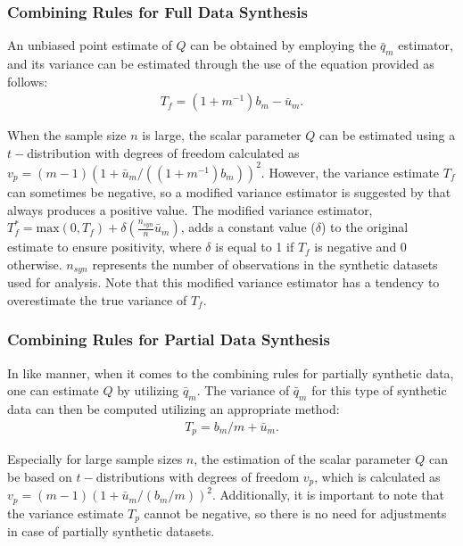 \subsubsection{Combining Rules for Full Data Synthesis}
\label{subsubsec:fullSyn}
An unbiased point estimate of $Q$ can be obtained by employing the $\bar{q}_m$ estimator, and its variance can be estimated through the use of the equation provided as follows:
\begin{align}
    \label{equ:tf-fully}
    T_{f}=(1+m^{-1})b_m-\bar{u}_m.
\end{align}

When the sample size $n$ is large, the scalar parameter $Q$ can be estimated using a $t-$distribution with degrees of freedom calculated as $v_p = (m - 1)(1 + \bar{u}_m/((1+m^{-1})b_m))^2$. However, the variance estimate $T_f$ can sometimes be negative, so a modified variance estimator is suggested by \citet{reiter2002satisfying} that always produces a positive value. The modified variance estimator, $T_{f}^{*} = \text{max}(0,T_{f}) + \delta(\frac{n_{syn}}{n}\bar{u}_m)$, adds a constant value ($\delta$) to the original estimate to ensure positivity, where $\delta$ is equal to 1 if $T_f$ is negative and 0 otherwise. $n_{syn}$ represents the number of observations in the synthetic datasets used for analysis. Note that this modified variance estimator has a tendency to overestimate the true variance of $T_f$.



\subsubsection{Combining Rules for Partial Data Synthesis}
\label{subsubsec:partialSyn}
In like manner, when it comes to the combining rules for partially synthetic data, one can estimate $Q$ by utilizing  $\bar{q}_m$. The variance of $\bar{q}_m$ for this type of synthetic data can then be computed utilizing an appropriate method:
\begin{align}
    \label{equ:tf-part}
    T_{p}=b_m/m + \bar{u}_m.
\end{align}

Especially for large sample sizes $n$, the estimation of the scalar parameter $Q$ can be based on $t-$distributions with degrees of freedom $v_p$, which is calculated as $v_p = (m - 1)(1 + \bar{u}_m/(b_m/m))^2$. Additionally, it is important to note that the variance estimate $T_p$ cannot be negative, so there is no need for adjustments in case of partially synthetic datasets.

